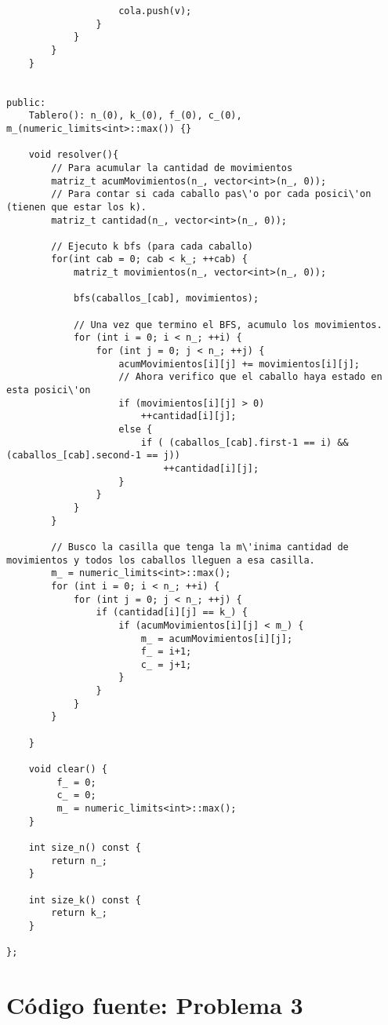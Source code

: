 \begin{frame}
\begin{lstlisting}
					cola.push(v);
				}
			}
		}
	}


public:
	Tablero(): n_(0), k_(0), f_(0), c_(0), m_(numeric_limits<int>::max()) {}

	void resolver(){
		// Para acumular la cantidad de movimientos
		matriz_t acumMovimientos(n_, vector<int>(n_, 0));
		// Para contar si cada caballo pas\'o por cada posici\'on (tienen que estar los k).
		matriz_t cantidad(n_, vector<int>(n_, 0));

		// Ejecuto k bfs (para cada caballo)
		for(int cab = 0; cab < k_; ++cab) {
			matriz_t movimientos(n_, vector<int>(n_, 0));

			bfs(caballos_[cab], movimientos);

			// Una vez que termino el BFS, acumulo los movimientos.
			for (int i = 0; i < n_; ++i) {
				for (int j = 0; j < n_; ++j) {
					acumMovimientos[i][j] += movimientos[i][j];
					// Ahora verifico que el caballo haya estado en esta posici\'on
					if (movimientos[i][j] > 0)
						++cantidad[i][j];
					else {
						if ( (caballos_[cab].first-1 == i) && (caballos_[cab].second-1 == j))
							++cantidad[i][j];
					}
				}
			}
		}

		// Busco la casilla que tenga la m\'inima cantidad de movimientos y todos los caballos lleguen a esa casilla.
		m_ = numeric_limits<int>::max();
		for (int i = 0; i < n_; ++i) {
			for (int j = 0; j < n_; ++j) {
				if (cantidad[i][j] == k_) {
					if (acumMovimientos[i][j] < m_) {
						m_ = acumMovimientos[i][j];
						f_ = i+1;
						c_ = j+1;
					}
				}
			}
		}

	}

	void clear() {
		 f_ = 0;
		 c_ = 0;
		 m_ = numeric_limits<int>::max();
	}

	int size_n() const {
		return n_;
	}

	int size_k() const {
		return k_;
	}

};
\end{lstlisting}
\end{frame}

\newpage
\section{Código fuente: Problema 3} \label{App:AppendixC}

